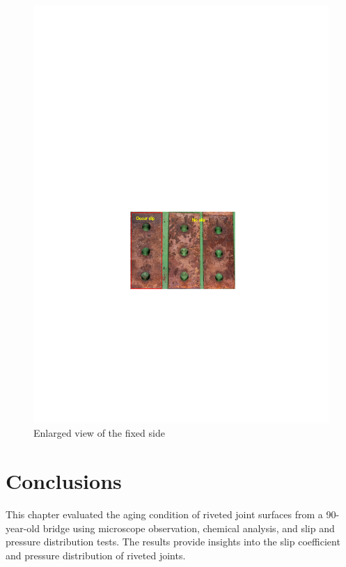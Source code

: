 \begin{figure}[htbp]
\begin{minipage}[t]{0.45\textwidth}
    \includegraphics[width=\linewidth]{imgs/ch3/fig3-30.pdf}
    \caption{Enlarged view of the fixed side}
    \label{fig3-30}
    \end{minipage}
\end{figure} 





\section{Conclusions}

This chapter evaluated the aging condition of riveted joint surfaces from a 90-year-old bridge using microscope observation, chemical analysis, and slip and pressure distribution tests. The results provide insights into the slip coefficient and pressure distribution of riveted joints.

